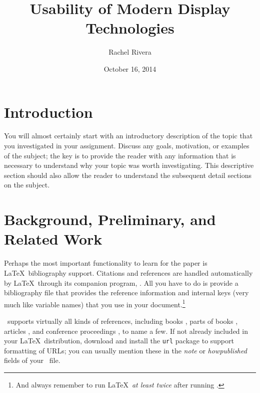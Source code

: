 \documentclass{article}
\title{Usability of Modern Display Technologies}
\author{Rachel Rivera}
\date{October 16, 2014}
\begin{document}
\maketitle


\pagebreak
\tableofcontents


\pagebreak

%
%
\section{Introduction}
\label{introduction}

You will almost certainly start with an introductory description of the topic that you investigated in your assignment.  Discuss any goals, motivation, or examples of the subject; the key is to provide the reader with any information that is necessary to understand why your topic was worth investigating.  This descriptive section should also allow the reader to understand the subsequent detail sections on the subject.

\section{Background, Preliminary, and Related Work}

Perhaps the most important functionality to learn for the paper is \LaTeX\ bibliography support.  Citations and references are handled automatically by \LaTeX\ through its companion program, \BibTeX.  All you have to do is provide a bibliography file that provides the reference information and internal keys (very much like variable names) that you use in your document.\footnote{And always remember to run \LaTeX\ \emph{at least twice} after running \BibTeX.}

\BibTeX\ supports virtually all kinds of references, including books \cite{dui,sgg,iokit,palmos}, parts of books \cite{userModeLinux}, articles \cite{nielsen:dui-review,heer-shneiderman,stackableThreads,xpkernel}, and conference proceedings \cite{ux-3d,iring,contextFileSearch,osHaskell,hibernator}, to name a few.  If not already included in your \LaTeX\ distribution, download and install the \texttt{url} package to support formatting of URLs; you can usually mention these in the \emph{note} or \emph{howpublished} fields of your \BibTeX\ file.
\end{document}
